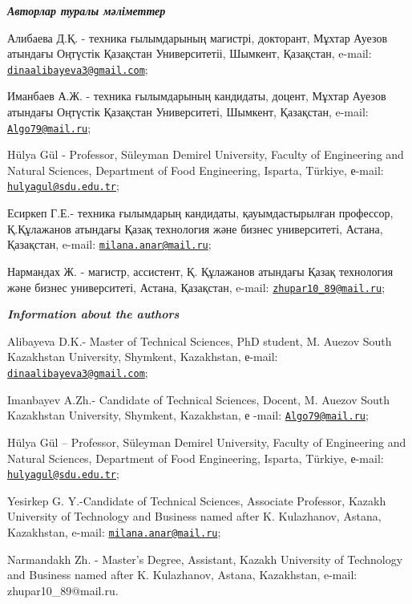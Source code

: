 \begin{authorinfo}
\emph{{\bfseries Авторлар туралы мәліметтер}}

Алибаева Д.Қ. - техника ғылымдарының магистрі, докторант, Мұхтар Ауезов
атындағы Оңтүстік Қазақстан Университетіі, Шымкент, Қазақстан, e-mail:
\href{mailto:dinaalibayeva3@gmail.com}{\nolinkurl{dinaalibayeva3@gmail.com}};

Иманбаев А.Ж. - техника ғылымдарының кандидаты, доцент, Мұхтар Ауезов
атындағы Оңтүстік Қазақстан Университеті, Шымкент, Қазақстан, e-mail:
\href{mailto:Algo79@mail.ru}{\nolinkurl{Algo79@mail.ru}};

Hülya Gül - Professor, Süleyman Demirel University, Faculty of
Engineering and Natural Sciences, Department of Food Engineering,
Isparta, Türkiye, е-mail:
\href{mailto:hulyagul@sdu.edu.tr}{\nolinkurl{hulyagul@sdu.edu.tr}};

Есиркеп Г.Е.- техника ғылымдарың кандидаты, қауымдастырылған профессор,
Қ.Құлажанов атындағы Қазақ технология және бизнес университеті, Астана,
Қазақстан, e-mail:
\href{mailto:milana.anar@mail.ru}{\nolinkurl{milana.anar@mail.ru}};

Нармандах Ж. - магистр, ассистент, Қ. Құлажанов атындағы Қазақ
технология және бизнес университеті, Астана, Қазақстан, e-mail:
\href{mailto:zhupar10_89@mail.ru}{\nolinkurl{zhupar10\_89@mail.ru}};

\emph{{\bfseries Information about the authors}}

Alibayeva D.K.- Master of Technical Sciences, PhD student, M. Auezov
South Kazakhstan University, Shymkent, Kazakhstan, е-mail:
\href{mailto:dinaalibayeva3@gmail.com}{\nolinkurl{dinaalibayeva3@gmail.com}};

Imanbayev A.Zh.- Candidate of Technical Sciences, Docent, M. Auezov
South Kazakhstan University, Shymkent, Kazakhstan, е -mail:
\href{mailto:Algo79@mail.ru}{\nolinkurl{Algo79@mail.ru}};

Hülya Gül -- Professor, Süleyman Demirel University, Faculty of
Engineering and Natural Sciences, Department of Food Engineering,
Isparta, Türkiye, е-mail:
\href{mailto:hulyagul@sdu.edu.tr}{\nolinkurl{hulyagul@sdu.edu.tr}};

Yesirkep G. Y.-Candidate of Technical Sciences, Associate Professor,
Kazakh University of Technology and Business named after K. Kulazhanov,
Astana, Kazakhstan, e-mail:
\href{mailto:milana.anar@mail.ru}{\nolinkurl{milana.anar@mail.ru}};

Narmandakh Zh. - Master's Degree, Assistant, Kazakh University of
Technology and Business named after K. Kulazhanov, Astana, Kazakhstan,
e-mail: zhupar10\_89@mail.ru.
\end{authorinfo}
